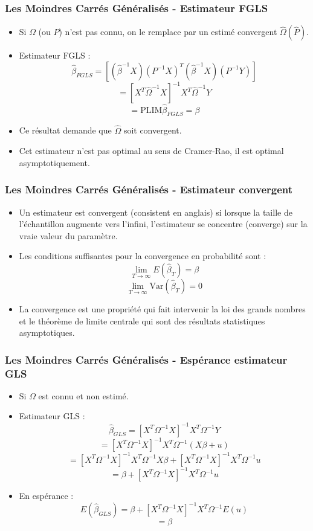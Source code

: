 \documentclass{beamer}
\begin{document}
\begin{frame}
\frametitle{Les Moindres Carrés Généralisés - Estimateur FGLS}
\begin{itemize}
    \item Si \( \Omega \) (ou \( P \)) n'est pas connu, on le remplace par un estimé convergent \( \hat{\Omega}(\hat{P}) \).
    \item Estimateur FGLS :
    \[
    \hat{\beta}_{FGLS} = \left[ (\hat{\beta}^{-1} X) (P^{-1} X)^T (\hat{\beta}^{-1} X) (P^{-1} Y) \right]
    \]
    \[
    = \left[ X^T \hat{\Omega}^{-1} X \right]^{-1} X^T \hat{\Omega}^{-1} Y
    \]
    \[
    = \text{PLIM} \hat{\beta}_{FGLS} = \beta
    \]
    \item Ce résultat demande que \( \hat{\Omega} \) soit convergent.
    \item Cet estimateur n'est pas optimal au sens de Cramer-Rao, il est optimal asymptotiquement.
\end{itemize}
\end{frame}

\begin{frame}
\frametitle{Les Moindres Carrés Généralisés - Estimateur convergent}
\begin{itemize}
    \item Un estimateur est convergent (consistent en anglais) si lorsque la taille de l’échantillon augmente vers l’infini, l’estimateur se concentre (converge) sur la vraie valeur du paramètre.
    \item Les conditions suffisantes pour la convergence en probabilité sont :
    \[
    \lim_{T \to \infty} E(\hat{\beta}_T) = \beta
    \]
    \[
    \lim_{T \to \infty} \text{Var}(\hat{\beta}_T) = 0
    \]
    \item La convergence est une propriété qui fait intervenir la loi des grands nombres et le théorème de limite centrale qui sont des résultats statistiques asymptotiques.
\end{itemize}
\end{frame}

\begin{frame}
\frametitle{Les Moindres Carrés Généralisés - Espérance estimateur GLS}
\begin{itemize}
    \item Si \( \Omega \) est connu et non estimé.
    \item Estimateur GLS :
    \[
    \hat{\beta}_{GLS} = \left[ X^T \Omega^{-1} X \right]^{-1} X^T \Omega^{-1} Y
    \]
    \[
    = \left[ X^T \Omega^{-1} X \right]^{-1} X^T \Omega^{-1} \left( X \beta + u \right)
    \]
    \[
    = \left[ X^T \Omega^{-1} X \right]^{-1} X^T \Omega^{-1} X \beta + \left[ X^T \Omega^{-1} X \right]^{-1} X^T \Omega^{-1} u
    \]
    \[
    = \beta + \left[ X^T \Omega^{-1} X \right]^{-1} X^T \Omega^{-1} u
    \]
    \item En espérance :
    \[
    E(\hat{\beta}_{GLS}) = \beta + \left[ X^T \Omega^{-1} X \right]^{-1} X^T \Omega^{-1} E(u)
    \]
    \[
    = \beta
    \]
\end{itemize}
\end{frame}
\end{document}
